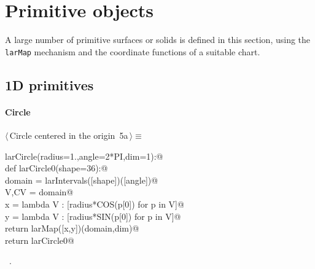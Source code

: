\documentclass[11pt,oneside]{article}	%
\begin{document}
\section{Primitive objects}
\label{sec:generators}

A large number of primitive surfaces or solids is defined in this section, using the \texttt{larMap} mechanism and the coordinate functions of a suitable chart.

\subsection{1D primitives}

\paragraph{Circle}
\begin{flushleft} \small \label{scrap6}
\protect{}$\langle\,$Circle centered in the origin\nobreak\ {\footnotesize 5a}$\,\rangle\equiv$
\vspace{-1ex}
\begin{list}{}{} \item
\mbox{}\verb@def larCircle(radius=1.,angle=2*PI,dim=1):@\\
\mbox{}\verb@   def larCircle0(shape=36):@\\
\mbox{}\verb@      domain = larIntervals([shape])([angle])@\\
\mbox{}\verb@      V,CV = domain@\\
\mbox{}\verb@      x = lambda V : [radius*COS(p[0]) for p in V]@\\
\mbox{}\verb@      y = lambda V : [radius*SIN(p[0]) for p in V]@\\
\mbox{}\verb@      return larMap([x,y])(domain,dim)@\\
\mbox{}\verb@   return larCircle0@\\
\mbox{}\verb@@{\NWsep}
\end{list}
\vspace{-1ex}
\footnotesize\addtolength{\baselineskip}{-1ex}
\begin{list}{}{\setlength{\itemsep}{-\parsep}\setlength{\itemindent}{-\leftmargin}}
\item \NWtxtMacroRefIn\ .
\end{list}
\end{flushleft}
\end{document}
